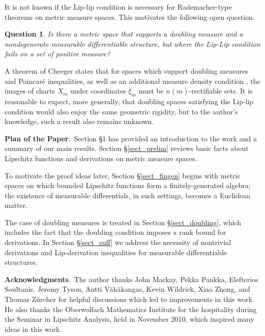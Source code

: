\documentclass[reqno]{amsart}
\theoremstyle{plain}
\newtheorem{ques}[thm]{Question}
\theoremstyle{definition}
\theoremstyle{remark}
\numberwithin{equation}{section}
\begin{document}
It is not known if the Lip-lip condition is necessary for Rademacher-type theorems on metric measure spaces.  This motivates the following open question.

\begin{ques} \label{ques_indep}
Is there a metric space that supports a doubling measure and a nondegenerate measurable differentiable structure, but where the Lip-Lip condition fails on a set of positive measure?
\end{ques}

A theorem of Cheeger \cite[Thm 14.2]{Cheeger} states that for spaces which support doubling measures and Poincar\'e inequalities, as well as an additional measure density condition \cite[Conj 4.63]{Cheeger}, the images of charts $X_m$ under coordinates $\xi_m$ must be $n(m)$-rectifiable sets.  It is reasonable to expect, more generally, that doubling spaces satisfying the Lip-lip condition would also enjoy the same geometric rigidity, but to the author's knowledge, such a result also remains unknown.

\vspace{.05in}

{\bf Plan of the Paper}.\ Section \S1 has provided an introduction to the work and a summary of our main results.  Section \S\ref{sect_prelim} reviews basic facts about Lipschitz functions and derivations on metric measure spaces.

To motivate the proof ideas later, Section \S\ref{sect_fingen} begins with metric spaces on which bounded Lipschitz functions form a finitely-generated algebra; the existence of measurable differentials, in such settings, becomes a Euclidean matter.

The case of doubling measures is treated in Section \S\ref{sect_doubling}, which includes the fact that the doubling condition imposes a rank bound for derivations.  In Section \S\ref{sect_suff} we address the necessity of nontrivial derivations and Lip-derivation inequalities for measurable differentiable structures.

\vspace{.1in}

{\bf Acknowledgments}.\ The author thanks John Mackay, Pekka Pankka, Elefterios Soultanis, Jeremy Tyson, Antti V\"ah\"akangas, Kevin Wildrick, Xiao Zhong, and Thomas Z\"urcher for helpful discussions which led to improvements in this work.  He also thanks the Oberwolfach Mathematics Institute for the hospitality during the Seminar in Lipschitz Analysis, held in November 2010, which inspired many ideas in this work.
\end{document}
